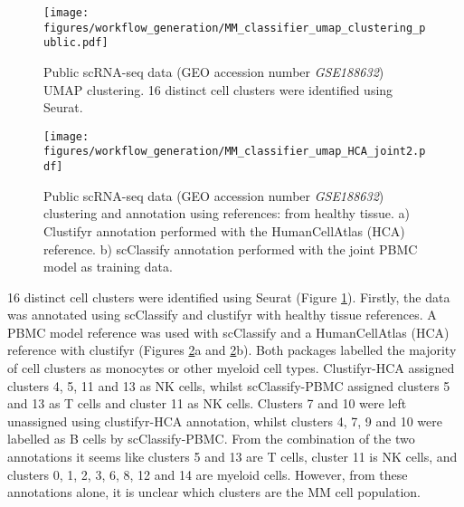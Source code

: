 \begin{figure}[htb]
\centering
\texttt{[image: figures/workflow\_generation/MM\_classifier\_umap\_clustering\_public.pdf]}
\caption[Public scRNA-seq data UMAP clustering]{Public scRNA-seq data (GEO accession number \textit{GSE188632}) UMAP clustering. 16 distinct cell clusters were identified using Seurat.
}
\label{fig:mm_class_umap_clustering}
\end{figure}
%
%
\begin{figure}[htb]
\centering
\texttt{[image: figures/workflow\_generation/MM\_classifier\_umap\_HCA\_joint2.pdf]}
\caption[Public scRNA-seq data annotation (HCA and PBMC model)]{Public scRNA-seq data (GEO accession number \textit{GSE188632}) clustering and annotation using references: from healthy tissue.
a) Clustifyr annotation performed with the HumanCellAtlas (HCA) reference.
b) scClassify annotation performed with the joint PBMC model as training data.
}
\label{fig:mm_class_umap_annotate}
\end{figure}
%
16 distinct cell clusters were identified using Seurat (Figure \ref{fig:mm_class_umap_clustering}).
Firstly, the data was annotated using scClassify and clustifyr with healthy tissue references.
A PBMC model reference was used with scClassify and a HumanCellAtlas (HCA) reference with clustifyr (Figures \ref{fig:mm_class_umap_annotate}a and \ref{fig:mm_class_umap_annotate}b).
Both packages labelled the majority of cell clusters as monocytes or other myeloid cell types.
Clustifyr-HCA assigned clusters 4, 5, 11 and 13 as NK cells, whilst scClassify-PBMC assigned clusters 5 and 13 as T cells and cluster 11 as NK cells.
Clusters 7 and 10 were left unassigned using clustifyr-HCA annotation, whilst clusters 4, 7, 9 and 10 were labelled as B cells by scClassify-PBMC.
From the combination of the two annotations it seems like clusters 5 and 13 are T cells, cluster 11 is NK cells, and clusters 0, 1, 2, 3, 6, 8, 12 and 14 are myeloid cells.
However, from these annotations alone, it is unclear which clusters are the MM cell population.

